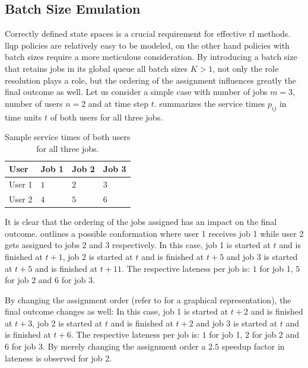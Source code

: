 \subsection{Batch Size Emulation}
\label{subsec:batch_size_emulation}

Correctly defined state spaces is a crucial requirement for effective \gls{rl} methods. \gls{llqp} policies are relatively easy to be modeled, on the other hand policies with batch sizes require a more meticulous consideration. By introducing a batch size that retains jobs in its global queue \ie all batch sizes $K>1$, not only the role resolution plays a role, but the ordering of the assignment influences greatly the final outcome as well. Let us consider a simple case with number of jobs $m=3$, number of users $n=2$ and at time step $t$.  summarizes the service times $p_{ij}$ in time units $t$ of both users for all three jobs.

\begin{table}[!ht]
	\centering
		\begin{tabular}{@{}llll@{}}
		\toprule
		User   & Job 1 & Job 2 & Job 3 \\ \midrule
		User 1 & $1$     & $2$     & $3$     \\
		User 2 & $4$     & $5$     & $6$     \\ \bottomrule
		\end{tabular}
	\caption{Sample service times of both users for all three jobs.}
	\label{tab:users_service_times_example}
\end{table}

It is clear that the ordering of the jobs assigned has an impact on the final outcome.  outlines a possible conformation where user 1 receives job 1 while user 2 gets assigned to jobs 2 and 3 respectively. In this case, job 1 is started at $t$ and is finished at $t+1$, job 2 is started at $t$ and is finished at $t+5$ and job 3 is started at $t+5$ and is finished at $t+11$. The respective lateness per job is: $1$ for job 1, $5$ for job 2 and $6$ for job $3$.

By changing the assignment order (refer to  for a graphical representation), the final outcome changes as well: In this case, job 1 is started at $t+2$ and is finished at $t+3$, job 2 is started at $t$ and is finished at $t+2$ and job 3 is started at $t$ and is finished at $t+6$. The respective lateness per job is: $1$ for job 1, $2$ for job 2 and $6$ for job $3$. By merely changing the assignment order a $2.5$ speedup factor in lateness is observed for job 2.

